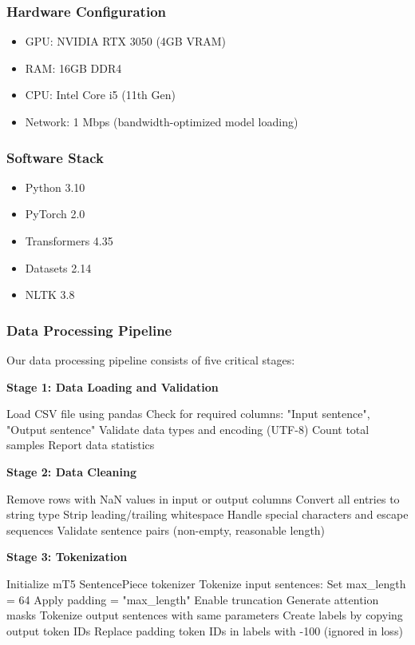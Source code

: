 \documentclass[12pt,a4paper]{article}
\begin{document}
\subsubsection{Hardware Configuration}
\begin{itemize}
    \item GPU: NVIDIA RTX 3050 (4GB VRAM)
    \item RAM: 16GB DDR4
    \item CPU: Intel Core i5 (11th Gen)
    \item Network: 1 Mbps (bandwidth-optimized model loading)
\end{itemize}

\subsubsection{Software Stack}
\begin{itemize}
    \item Python 3.10
    \item PyTorch 2.0
    \item Transformers 4.35
    \item Datasets 2.14
    \item NLTK 3.8
\end{itemize}

\subsubsection{Data Processing Pipeline}

Our data processing pipeline consists of five critical stages:

\textbf{Stage 1: Data Loading and Validation}
\begin{algorithmic}[1]
\STATE Load CSV file using pandas
\STATE Check for required columns: "Input sentence", "Output sentence"
\STATE Validate data types and encoding (UTF-8)
\STATE Count total samples
\STATE Report data statistics
\end{algorithmic}

\textbf{Stage 2: Data Cleaning}
\begin{algorithmic}[1]
\STATE Remove rows with NaN values in input or output columns
\STATE Convert all entries to string type
\STATE Strip leading/trailing whitespace
\STATE Handle special characters and escape sequences
\STATE Validate sentence pairs (non-empty, reasonable length)
\end{algorithmic}

\textbf{Stage 3: Tokenization}
\begin{algorithmic}[1]
\STATE Initialize mT5 SentencePiece tokenizer
\STATE Tokenize input sentences:
\STATE \quad Set max\_length = 64
\STATE \quad Apply padding = "max\_length"
\STATE \quad Enable truncation
\STATE \quad Generate attention masks
\STATE Tokenize output sentences with same parameters
\STATE Create labels by copying output token IDs
\STATE Replace padding token IDs in labels with -100 (ignored in loss)
\end{algorithmic}
\end{document}
